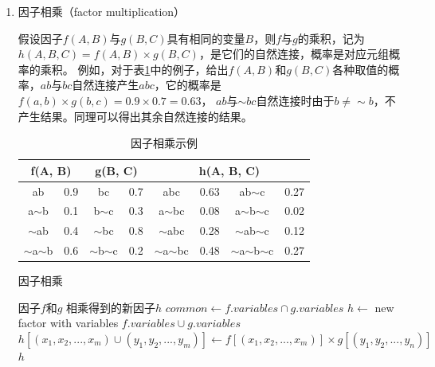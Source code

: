 \documentclass[10pt,letterpaper]{ctexart}
\newcommand{\tabref}[1]{表\ref{#1}}
\begin{document}
\begin{enumerate}[itemindent=2em,label=\arabic*、]
    \item 因子相乘（factor multiplication）
    \par \qquad 假设因子$f(A,B)$与$g(B, C)$具有相同的变量$B$，则$f$与$g$的乘积，记为$h(A,B,C)=f(A,B) \times g(B,C)$，是它们的自然连接，概率是对应元组概率的乘积。
    例如，对于\tabref{tab:mul}中的例子，给出$f(A,B)$和$g(B,C)$各种取值的概率，$ab$与$bc$自然连接产生$abc$，它的概率是$f(a,b) \times g(b,c)=0.9\times 0.7=0.63$，
    $ab$与$\sim bc$自然连接时由于$b \neq \sim b$，不产生结果。同理可以得出其余自然连接的结果。
    \begin{table}[!htbp]
      \centering
      \begin{tabular}{|c|c|c|c|c|c|c|c|}
          \hline
          \multicolumn{2}{|c|}{f(A, B)} & \multicolumn{2}{|c|}{g(B, C)} & \multicolumn{4}{|c|}{h(A, B, C)} \\
          \hline
          ab & 0.9 & bc & 0.7 & abc & 0.63 & ab$\sim$c & 0.27\\
          a$\sim$b & 0.1 & b$\sim$c & 0.3 & a$\sim$bc & 0.08 & a$\sim$b$\sim$c & 0.02\\
          $\sim$ab & 0.4 & $\sim$bc & 0.8 & $\sim$abc & 0.28 & $\sim$ab$\sim$c & 0.12\\
          $\sim$a$\sim$b & 0.6 & $\sim$b$\sim$c & 0.2 & $\sim$a$\sim$bc & 0.48 & $\sim$a$\sim$b$\sim$c & 0.27\\
          \hline
      \end{tabular}
      \caption{因子相乘示例}\label{tab:mul}
    \end{table}

    \begin{algorithm}
      \caption{因子相乘}
      \begin{algorithmic}[1] %
          \Require 因子$f$和$g$
          \Ensure 相乘得到的新因子$h$
            \State $common \gets f.variables \cap g.variables$
            \State $h \gets$ new factor with variables $f.variables \cup g.variables$
                  \State $h[(x_1,x_2, ..., x_m) \cup (y_1, y_2, ..., y_m)] \gets f[(x_1,x_2, ..., x_m)] \times g[(y_1, y_2, ..., y_n)]$
                \EndIf
              \EndFor
            \EndFor
            \State \Return $h$
          \EndFunction
      \end{algorithmic}
    \end{algorithm}

  \end{enumerate}
\end{document}
